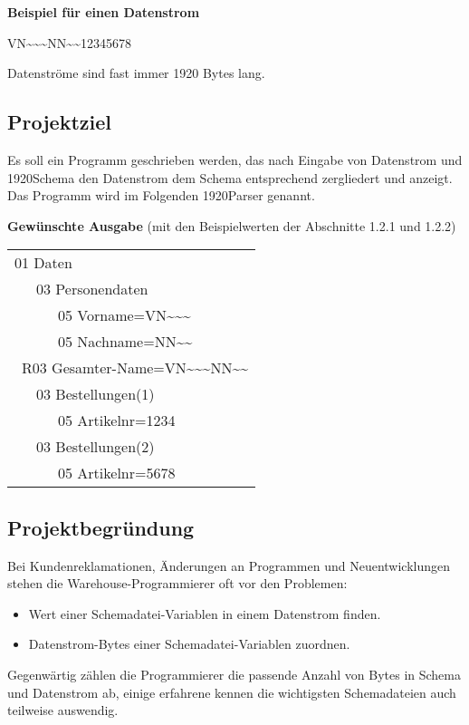 \textbf{Beispiel für einen Datenstrom}

VN\textasciitilde \textasciitilde \textasciitilde NN\textasciitilde\textasciitilde12345678

Datenströme sind fast immer 1920 Bytes lang.


\subsection{Projektziel}
\label{sec:Projektziel}
Es soll ein Programm geschrieben werden, das nach Eingabe von Datenstrom und 1920Schema den Datenstrom dem Schema entsprechend zergliedert und anzeigt. Das Programm wird im Folgenden 1920Parser genannt.

\textbf{Gewünschte Ausgabe} (mit den Beispielwerten der Abschnitte 1.2.1 und 1.2.2)

\begin{tabularx}{0px}{l}
01 Daten\\
\ \ \ 03 Personendaten\\
\ \ \ \ \ \ 05 Vorname=VN\textasciitilde \textasciitilde \textasciitilde\\
\ \ \ \ \ \ 05 Nachname=NN\textasciitilde \textasciitilde\\
\ R03 Gesamter-Name=VN\textasciitilde \textasciitilde \textasciitilde NN\textasciitilde \textasciitilde\\
\ \ \ 03 Bestellungen(1)\\
\ \ \ \ \ \ 05 Artikelnr=1234\\
\ \ \ 03 Bestellungen(2)\\
\ \ \ \ \ \ 05 Artikelnr=5678\\
\end{tabularx}

\subsection{Projektbegründung}
\label{sec:Projektbegruendung}
Bei Kundenreklamationen, Änderungen an Programmen und Neuentwicklungen stehen die Warehouse-Programmierer oft vor den Problemen:

\begin{itemize}
\item Wert einer Schemadatei-Variablen in einem Datenstrom finden.
\item Datenstrom-Bytes einer Schemadatei-Variablen zuordnen.
\end{itemize}

Gegenwärtig zählen die Programmierer die passende Anzahl von Bytes in Schema und Datenstrom ab, einige erfahrene kennen die wichtigsten Schemadateien auch teilweise auswendig. 


